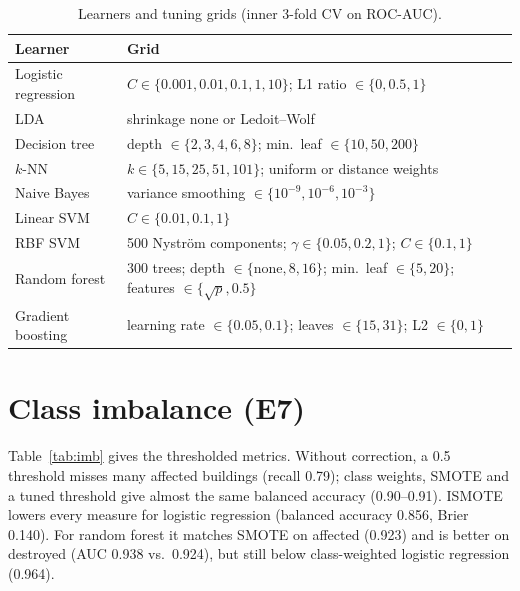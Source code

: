 \documentclass[journal,a4paper]{IEEEtran}
\begin{document}
\begin{table}[t]
\centering\footnotesize
\setlength{\tabcolsep}{3pt}
\caption{Learners and tuning grids (inner 3-fold CV on ROC-AUC).}\label{tab:grids}
\begin{tabularx}{\columnwidth}{@{}L{2.2cm}Y@{}}
\toprule
\textbf{Learner} & \textbf{Grid}\\
\midrule
Logistic regression & $C \in \{0.001, 0.01, 0.1, 1, 10\}$; L1 ratio $\in \{0, 0.5, 1\}$\\
LDA & shrinkage none or Ledoit--Wolf\\
Decision tree & depth $\in \{2,3,4,6,8\}$; min.\ leaf $\in \{10,50,200\}$\\
$k$-NN & $k \in \{5,15,25,51,101\}$; uniform or distance weights\\
Naive Bayes & variance smoothing $\in \{10^{-9},10^{-6},10^{-3}\}$\\
Linear SVM & $C \in \{0.01,0.1,1\}$\\
RBF SVM & 500 Nystr\"om components; $\gamma \in \{0.05,0.2,1\}$; $C \in \{0.1,1\}$\\
Random forest & 300 trees; depth $\in \{\text{none},8,16\}$; min.\ leaf $\in \{5,20\}$; features $\in \{\sqrt{p}, 0.5\}$\\
Gradient boosting & learning rate $\in \{0.05,0.1\}$; leaves $\in \{15,31\}$; L2 $\in \{0,1\}$\\
\bottomrule
\end{tabularx}
\end{table}

\section{Class imbalance (E7)}\label{app:imb}
Table~\ref{tab:imb} gives the thresholded metrics. Without correction, a 0.5 threshold misses many affected buildings (recall 0.79); class weights, SMOTE and a tuned threshold give almost the same balanced accuracy (0.90--0.91). ISMOTE lowers every measure for logistic regression (balanced accuracy 0.856, Brier 0.140). For random forest it matches SMOTE on affected (0.923) and is better on destroyed (AUC 0.938 vs.\ 0.924), but still below class-weighted logistic regression (0.964).
\end{document}
